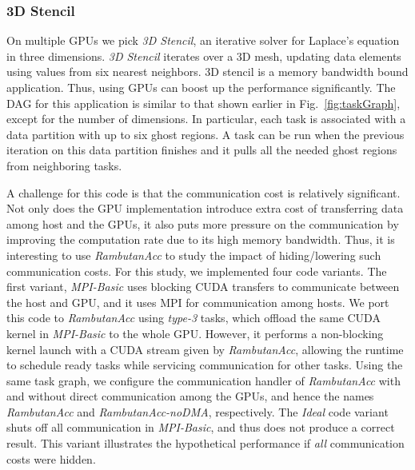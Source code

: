 \subsubsection{3D Stencil}
On multiple GPUs we pick {\em 3D Stencil}, an iterative solver for Laplace's equation in three dimensions.
{\em 3D Stencil} iterates over a 3D mesh, updating data elements using values from six nearest neighbors.
3D stencil is a memory bandwidth bound application. 
Thus, using GPUs can boost up the performance significantly.
The DAG for this application is similar to that shown earlier in Fig.~\ref{fig:taskGraph}, except for the number of dimensions.
In particular, each task is associated with a data partition with up to six ghost regions.
A task can be run when the previous iteration on this data partition finishes and it pulls all the needed ghost regions from neighboring tasks.

A challenge for this code is that the communication cost is relatively significant.
Not only does the GPU implementation introduce extra cost of transferring data among host and the GPUs, it also puts more pressure on the communication by improving the computation rate due to its high memory bandwidth.
Thus, it is interesting to use {\em RambutanAcc} to study the impact of hiding/lowering such communication costs.
For this study, we implemented four code variants.
The first variant, {\em MPI-Basic} uses blocking CUDA transfers to communicate between the host and GPU, and it uses MPI for communication among hosts.
We port this code to {\em RambutanAcc} using {\em type-3} tasks, which offload the same CUDA kernel in {\em MPI-Basic} to the whole GPU.
However, it performs a non-blocking kernel launch with a CUDA stream given by {\em RambutanAcc}, allowing the runtime to schedule ready tasks while servicing communication for other tasks.
Using the same task graph, we configure the communication handler of {\em RambutanAcc} with and without direct communication among the GPUs, and hence the names {\em RambutanAcc} and {\em RambutanAcc-noDMA}, respectively.
The {\em Ideal} code variant shuts off all communication in {\em MPI-Basic}, and thus does not produce a correct result.
This variant illustrates the hypothetical performance if {\em all} communication costs were hidden.

